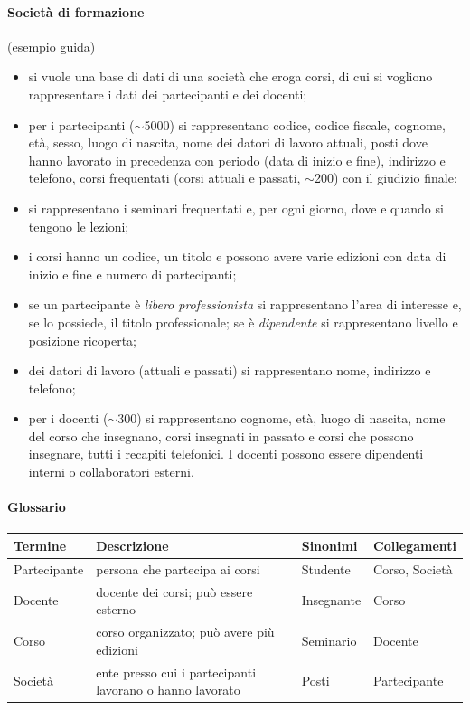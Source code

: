 \documentclass[a4paper,12pt]{article}
\begin{document}
\paragraph{Società di formazione} (esempio guida)
\begin{itemize}
  \item si vuole una base di dati di una società che eroga corsi, di cui si
    vogliono rappresentare i dati dei partecipanti e dei docenti;
  \item per i partecipanti ($\sim$5000) si rappresentano codice, codice
    fiscale, cognome, età, sesso, luogo di nascita, nome dei datori di lavoro
    attuali, posti dove hanno lavorato in precedenza con periodo (data di
    inizio e fine), indirizzo e telefono, corsi frequentati (corsi attuali e
    passati, $\sim$200) con il giudizio finale;
  \item si rappresentano i seminari frequentati e, per ogni giorno, dove e
    quando si tengono le lezioni;
  \item i corsi hanno un codice, un titolo e possono avere varie edizioni con
    data di inizio e fine e numero di partecipanti;
  \item se un partecipante è \emph{libero professionista} si rappresentano
    l'area di interesse e, se lo possiede, il titolo professionale; se è
    \emph{dipendente} si rappresentano livello e posizione ricoperta;
  \item dei datori di lavoro (attuali e passati) si rappresentano nome,
    indirizzo e telefono;
  \item per i docenti ($\sim$300) si rappresentano cognome, età, luogo di
    nascita, nome del corso che insegnano, corsi insegnati in passato e corsi
    che possono insegnare, tutti i recapiti telefonici. I docenti possono
    essere dipendenti interni o collaboratori esterni.
\end{itemize}

\paragraph{Glossario}
\begin{center}
\begin{tabular}{|l|p{4.5cm}|l|l|}
\hline
\textbf{Termine} & \textbf{Descrizione} & \textbf{Sinonimi} & \textbf{Collegamenti}\\ \hline
Partecipante & persona che partecipa ai corsi & Studente & Corso, Società\\
Docente & docente dei corsi; può essere esterno & Insegnante & Corso\\
Corso & corso organizzato; può avere più edizioni & Seminario & Docente\\
Società & ente presso cui i partecipanti lavorano o hanno lavorato & Posti &
  Partecipante\\ \hline
\end{tabular}
\end{center}
\end{document}
